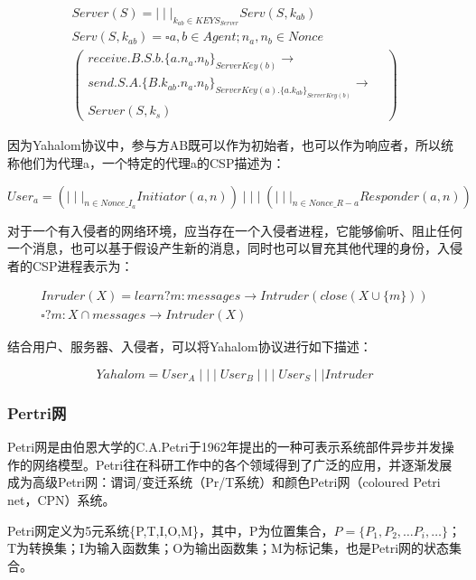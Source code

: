 \documentclass[cs4size,a4pape,UTF8]{ctexart}
\numberwithin{equation}{section}
\numberwithin{table}{section}
\numberwithin{figure}{section}
\begin{document}
\begin{multline}
Server(S)={\mid\mid\mid}_{k_{ab}\in{KEYS_{Server}}}Serv(S,k_{ab}) \\
Serv(S,k_{ab})=\square{a},b\in{Agent};n_{a},n_{b}\in{Nonce}\\
\left(
\begin{array}{lr}
	{receive.B.S.b.\{a.n_{a}.n_{b}\}_{ServerKey(b)}}\rightarrow& \\
	{send.S.A.\{B.k_{ab}.n_{a}.n_{b}\}_{ServerKey(a).\{a.k_{ab}\}_{ServerKey(b)}}}\rightarrow& \\
	{Server(S,k_{s})}&
\end{array}
\right)
\end{multline}

因为Yahalom协议中，参与方AB既可以作为初始者，也可以作为响应者，所以统称他们为代理a，一个特定的代理a的CSP描述为：

\begin{equation}
User_{a}=({\mid\mid\mid}_{n\in{Nonce\_I_{a}}}Initiator(a,n))\mid\mid\mid({\mid\mid\mid}_{n\in{Nonce\_R-{a}}}Responder(a,n))
\end{equation}

对于一个有入侵者的网络环境，应当存在一个入侵者进程，它能够偷听、阻止任何一个消息，也可以基于假设产生新的消息，同时也可以冒充其他代理的身份，入侵者的CSP进程表示为：

\begin{multline}
Inruder(X)=learn?m:messages\rightarrow{Intruder(close(X\cup{\{m\}}))}\\
\square{?}m:X\cap{messages}\rightarrow{Intruder(X)}
\end{multline}

结合用户、服务器、入侵者，可以将Yahalom协议进行如下描述：

\begin{equation}
Yahalom=User_{A}\mid\mid\mid{User_{B}}\mid\mid\mid{User_{S}}\mid\mid{Intruder}
\end{equation}

\subsubsection{Pertri网}
Petri网是由伯恩大学的C.A.Petri于1962年提出的一种可表示系统部件异步并发操作的网络模型。Petri往在科研工作中的各个领域得到了广泛的应用，并逐渐发展成为高级Petri网：谓词/变迁系统（Pr/T系统）和颜色Petri网（coloured Petri net，CPN）系统。

Petri网定义为5元系统\{P,T,I,O,M\}，其中，P为位置集合，$P=\{P_{1},P_{2},\ldots{P_{i}},\ldots{\}}$；T为转换集；I为输入函数集；O为输出函数集；M为标记集，也是Petri网的状态集合。
\end{document}
